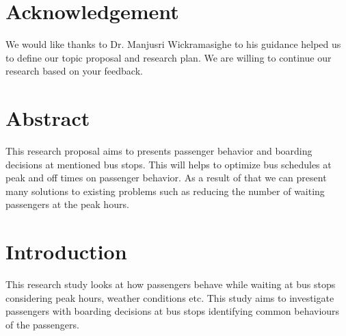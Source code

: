 \documentclass[12pt,a4paper]{report}
\begin{document}
\chapter*{Acknowledgement}

We would like thanks to Dr. Manjusri Wickramasighe to his guidance  helped us to define our topic proposal and research plan. We are willing to continue our research based on your feedback.
\clearpage

\chapter*{Abstract}
This research proposal aims to presents passenger behavior and boarding decisions at mentioned bus stops. This will helps to optimize bus schedules at peak and off times on passenger behavior.  As a result of that we can present many solutions to existing problems such as reducing the number of waiting passengers at the peak hours.

\clearpage
{}
\setcounter{page}{1}
\setcounter{secnumdepth}{-1}


\tableofcontents
\clearpage


\setcounter{page}{1}
\setcounter{secnumdepth}{3}



\chapter{Introduction}

This research study looks at how passengers behave while waiting at bus stops considering peak hours, weather conditions etc. This study aims to investigate passengers with boarding decisions at bus stops identifying common behaviours of the passengers.


\end{document}
